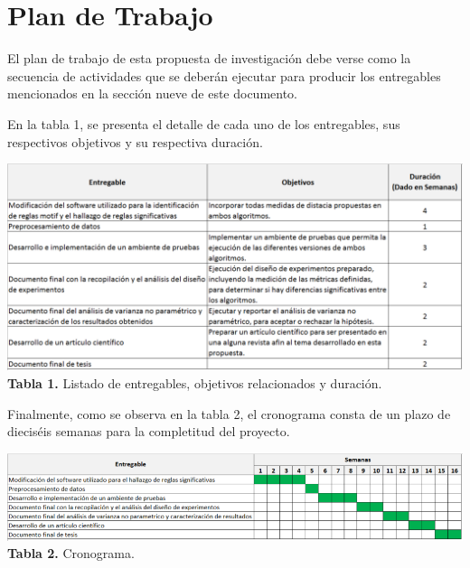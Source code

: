 \section{\textbf{Plan de Trabajo}}
El plan de trabajo de esta propuesta de investigaci\'on debe verse como la secuencia de actividades que se deber\'an ejecutar para producir los entregables mencionados en la secci\'on nueve de este documento.\par
En la tabla 1, se presenta el detalle de cada uno de los entregables, sus respectivos objetivos y su respectiva duraci\'on.\par
\begin{center}
\includegraphics[scale=0.65]{deliverables.png}
\vspace*{10pt}
\footnotesize{\textbf{Tabla 1.} Listado de entregables, objetivos relacionados y duraci\'on.}
\end{center}
Finalmente, como se observa en la tabla 2, el cronograma consta de un plazo de diecis\'eis semanas para la completitud del proyecto.
\begin{center}
\includegraphics[scale=0.85]{projectPlan.png}
\vspace*{10pt}
\footnotesize{\textbf{Tabla 2.} Cronograma.}
\end{center}
